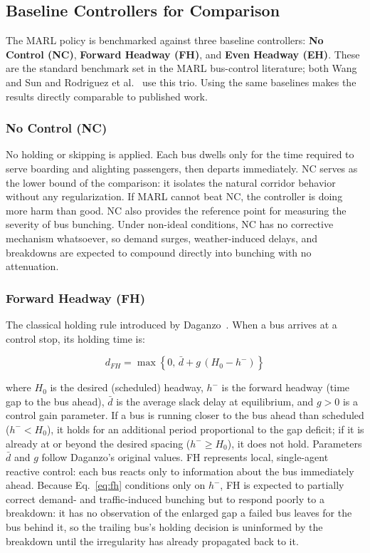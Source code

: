 \clearpage

\subsection{Baseline Controllers for Comparison}

The MARL policy is benchmarked against three baseline controllers: \textbf{No Control (NC)}, \textbf{Forward Headway (FH)}, and \textbf{Even Headway (EH)}. These are the standard benchmark set in the MARL bus-control literature; both Wang and Sun \cite{Wangsun} and Rodriguez et al.~\cite{Rodriguez2023Cooperative} use this trio. Using the same baselines makes the results directly comparable to published work.

\subsubsection{No Control (NC)}

No holding or skipping is applied. Each bus dwells only for the time required to serve boarding and alighting passengers, then departs immediately. NC serves as the lower bound of the comparison: it isolates the natural corridor behavior without any regularization. If MARL cannot beat NC, the controller is doing more harm than good. NC also provides the reference point for measuring the severity of bus bunching. Under non-ideal conditions, NC has no corrective mechanism whatsoever, so demand surges, weather-induced delays, and breakdowns are expected to compound directly into bunching with no attenuation.

\subsubsection{Forward Headway (FH)}

The classical holding rule introduced by Daganzo~\cite{Daganzo2009}. When a bus arrives at a control stop, its holding time is:

\begin{equation}
d_{FH} = \max\!\left\{0,\, \bar{d} + g\,(H_0 - h^-)\right\}
\label{eq:fh}
\end{equation}

where $H_0$ is the desired (scheduled) headway, $h^-$ is the forward headway (time gap to the bus ahead), $\bar{d}$ is the average slack delay at equilibrium, and $g > 0$ is a control gain parameter. If a bus is running closer to the bus ahead than scheduled ($h^- < H_0$), it holds for an additional period proportional to the gap deficit; if it is already at or beyond the desired spacing ($h^- \geq H_0$), it does not hold. Parameters $\bar{d}$ and $g$ follow Daganzo's original values. FH represents local, single-agent reactive control: each bus reacts only to information about the bus immediately ahead. Because Eq.~\eqref{eq:fh} conditions only on $h^-$, FH is expected to partially correct demand- and traffic-induced bunching but to respond poorly to a breakdown: it has no observation of the enlarged gap a failed bus leaves for the bus behind it, so the trailing bus's holding decision is uninformed by the breakdown until the irregularity has already propagated back to it.

